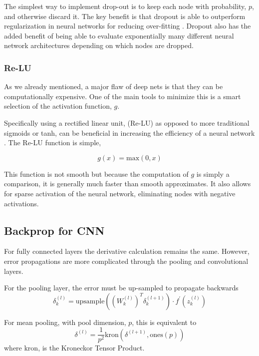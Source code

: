 \documentclass[12pt, twocolumn]{article}
\begin{document}
The simplest way to implement drop-out is to keep each node with probability, $p$, and otherwise discard it. The key benefit is that dropout is able to outperform regularization in neural networks for reducing over-fitting \cite{Dropout}. Dropout also has the added benefit of being able to evaluate exponentially many different neural network architectures depending on which nodes are dropped.
 
\subsubsection{Re-LU}

As we already mentioned, a major flaw of deep nets is that they can be computationally expensive. One of the main tools to minimize this is a smart selection of the activation function, $g$. 

Specifically using a rectified linear unit, (Re-LU) as opposed to more traditional sigmoids or tanh, can be beneficial in increasing the efficiency of a neural network \cite{imagenet}. The Re-LU function is simple, 

\begin{equation}
g(x)= \textrm{max}(0,x)
\end{equation}

This function is not smooth but because the computation of $g$ is simply a comparison, it is generally much faster than smooth approximates. It also allows for sparse activation of the neural network, eliminating nodes with negative activations. 

\subsection{Backprop for CNN}
For fully connected layers  the derivative calculation remains the same. However,  error propagations are more complicated through the pooling and convolutional layers. 

For the pooling layer, the error must be up-sampled to propagate backwards
\begin{equation}
\delta^{(l)}_k=\textrm{upsample}((W^{(l)}_k)^T \delta^{(l+1)}_k) \cdot f^{\prime}(z^{(l)}_k)
\end{equation}


For mean pooling, with pool dimension, $p$, this is equivalent to 
\begin{equation}
\delta^{(l)}= \frac{1}{p^2}  \textrm{kron}(\delta^{(l+1)}, \textrm{ones}(p))
\end{equation}
where kron, is the Kroneckor Tensor Product.
\end{document}
